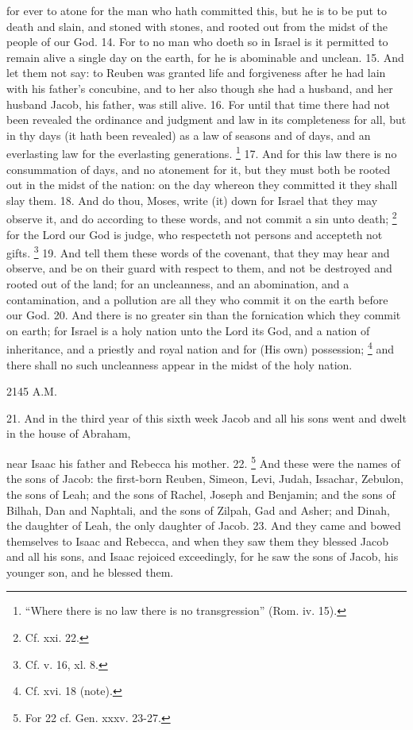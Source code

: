 for ever to atone for the man who hath committed this, but he is to be put to death and slain, and stoned with stones, and rooted out from the midst of the people of our God. 14. For to no man who doeth so in Israel is it permitted to remain alive a single day on the earth, for he is abominable and unclean. 15. And let them not say: to Reuben was granted life and forgiveness after he had lain with his father's concubine, and to her also though she had a husband, and her husband Jacob, his father, was still alive. 16. For until that time there had not been revealed the ordinance and judgment and law in its completeness for all, but in thy days (it hath been revealed) as a law of seasons and of days, and an everlasting law for the everlasting generations. \footnote{``Where there is no law there is no transgression'' (Rom. iv. 15).} 17. And for this law there is no consummation of days, and no atonement for it, but they must both be rooted out in the midst of the nation: on the day whereon they committed it they shall slay them. 18. And do thou, Moses, write (it) down for Israel that they may observe it, and do according to these words, and not commit a sin unto death; \footnote{Cf. xxi. 22.} for the Lord our God is judge, who respecteth not persons and accepteth not gifts. \footnote{Cf. v. 16, xl. 8.} 19. And tell them these words of the covenant, that they may hear and observe, and be on their guard with respect to them, and not be destroyed and rooted out of the land; for an uncleanness, and an abomination, and a contamination, and a pollution are all they who commit it on the earth before our God. 20. And there is no greater sin than the fornication which they commit on earth; for Israel is a holy nation unto the Lord its God, and a nation of inheritance, and a priestly and royal nation and for (His own) possession; \footnote{Cf. xvi. 18 (note).} and there shall no such uncleanness appear in the midst of the holy nation.

2145 A.M.

21. And in the third year of this sixth week Jacob and all his sons went and dwelt in the house of Abraham,

near Isaac his father and Rebecca his mother. 22. \footnote{For 22 cf. Gen. xxxv. 23-27.} And these were the names of the sons of Jacob: the first-born Reuben, Simeon, Levi, Judah, Issachar, Zebulon, the sons of Leah; and the sons of Rachel, Joseph and Benjamin; and the sons of Bilhah, Dan and Naphtali, and the sons of Zilpah, Gad and Asher; and Dinah, the daughter of Leah, the only daughter of Jacob. 23. And they came and bowed themselves to Isaac and Rebecca, and when they saw them they blessed Jacob and all his sons, and Isaac rejoiced exceedingly, for he saw the sons of Jacob, his younger son, and he blessed them.

